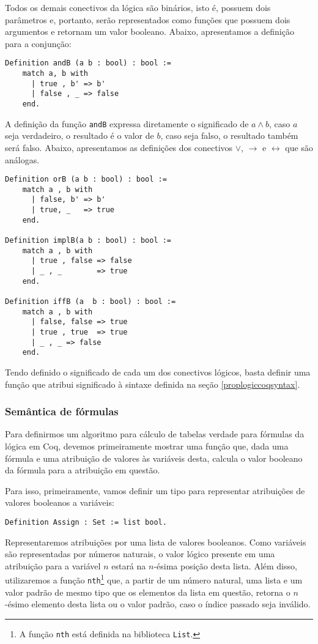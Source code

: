 Todos os demais conectivos da lógica são binários, isto é, possuem
dois parâmetros e, portanto, serão representados como funções que
possuem dois argumentos e retornam um valor booleano. Abaixo,
apresentamos a definição para a conjunção:
\begin{lstlisting}
Definition andB (a b : bool) : bool :=
    match a, b with
      | true , b' => b'
      | false , _ => false
    end.
\end{lstlisting}
A definição da função \texttt{andB} expressa diretamente o significado
de $a \land b$, caso $a$ seja verdadeiro, o resultado é o valor de
$b$, caso seja falso, o resultado também será falso. Abaixo,
apresentamos as definições dos conectivos $\lor$, $\to$ e
$\leftrightarrow$ que são análogas.
\begin{lstlisting}
Definition orB (a b : bool) : bool :=
    match a , b with
      | false, b' => b'
      | true, _   => true
    end.

Definition implB(a b : bool) : bool :=
    match a , b with
      | true , false => false
      | _ , _        => true
    end.

Definition iffB (a  b : bool) : bool :=
    match a , b with
      | false, false => true
      | true , true  => true
      | _ , _ => false
    end.
\end{lstlisting}
Tendo definido o significado de cada um dos conectivos lógicos, basta
definir uma função que atribui significado à sintaxe definida na seção
\ref{proplogiccoqsyntax}.

\subsubsection{Semântica de fórmulas}

Para definirmos um algoritmo para cálculo de tabelas verdade para
fórmulas da lógica em Coq, devemos primeiramente mostrar uma
função que, dada uma fórmula e uma atribuição de valores às variáveis
desta, calcula o valor booleano da fórmula para a atribuição em
questão.

Para isso, primeiramente, vamos definir um tipo para representar atribuições de
valores booleanos a variáveis:
\begin{lstlisting}
Definition Assign : Set := list bool.
\end{lstlisting}
Representaremos atribuições por uma lista de valores booleanos. Como
variáveis são representadas por números naturais, o valor lógico
presente em uma atribuição para a variável $n$ estará na $n$-ésima
posição desta lista. Além disso, utilizaremos a função
\texttt{nth}\footnote{A função \texttt{nth} está definida na biblioteca \texttt{List}.}
que, a partir de um número natural, uma lista e um valor padrão de
mesmo tipo que os elementos da lista em questão, retorna o $n$-ésimo
elemento desta lista ou o valor padrão, caso o índice passado seja
inválido.

